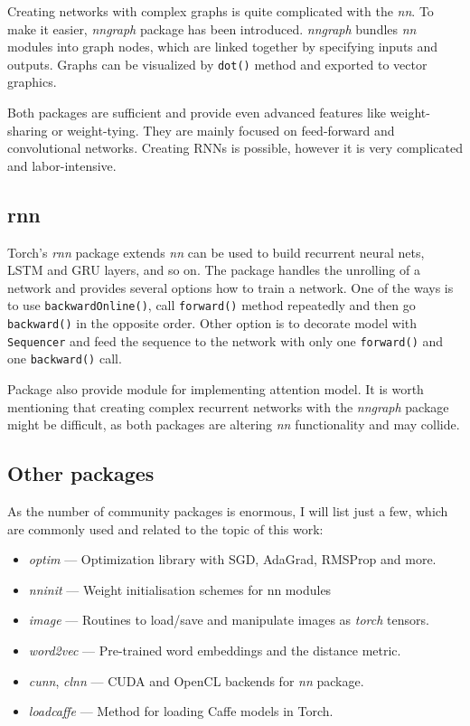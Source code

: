 Creating networks with complex graphs is quite complicated with the \emph{nn}. To make it easier, \emph{nngraph} package has been introduced. \emph{nngraph} bundles \emph{nn} modules into graph nodes, which are linked together by specifying inputs and outputs. Graphs can be visualized by \texttt{dot()} method and exported to vector graphics.

Both packages are sufficient and provide even advanced features like weight-sharing or weight-tying. They are mainly focused on feed-forward and convolutional networks. Creating RNNs is possible, however it is very complicated and labor-intensive.

\subsection{rnn}

Torch's \emph{rnn} package extends \emph{nn} can be used to build recurrent neural nets, LSTM and GRU layers, and so on. The package handles the unrolling of a network and provides several options how to train a network. One of the ways is to use \texttt{backwardOnline()}, call \texttt{forward()} method repeatedly and then go \texttt{backward()} in the opposite order. Other option is to decorate model with \texttt{Sequencer} and feed the sequence to the network with only one \texttt{forward()} and one \texttt{backward()} call.

Package also provide module for implementing attention model\cite{DBLP:journals/corr/MnihHGK14}. It is worth mentioning that creating complex recurrent networks with the \emph{nngraph} package might be difficult, as both packages are altering \emph{nn} functionality and may collide.

\subsection{Other packages}

As the number of community packages is enormous, I will list just a few, which are commonly used and related to the topic of this work:

\vspace{5mm}
\begin{minipage}{0.9\textwidth}
	\begin{itemize}
		\item \emph{optim} --- Optimization library with SGD, AdaGrad, RMSProp and more.
		\item \emph{nninit} --- Weight initialisation schemes for nn modules
		\item \emph{image} --- Routines to load/save and manipulate images as \emph{torch} tensors.
		\item \emph{word2vec} --- Pre-trained word embeddings and the distance metric.
		\item \emph{cunn}, \emph{clnn} --- CUDA and OpenCL backends for \emph{nn} package.
		\item \emph{loadcaffe} --- Method for loading Caffe models in Torch.
	\end{itemize}
\end{minipage}
\vspace{3mm}

